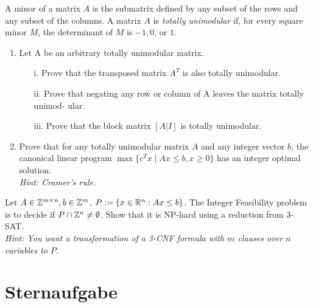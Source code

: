 \documentclass{uebung_cs}
\begin{document}
\begin{aufgabe}
	A minor of a matrix $A$ is the submatrix defined by any subset of the rows and any subset of the columns. A matrix $A$ is \emph{totally unimodular} if, for every square minor $M$, the determinant of $M$ is $−1, 0$, or $1$.
	\begin{enumerate}
		\item Let A be an arbitrary totally unimodular matrix.
		\begin{itemize}
			\item[i.] Prove that the transposed matrix $A^T$ is also totally unimodular.
			\item[ii.] Prove that negating any row or column of A leaves the matrix totally unimod- ular.
			\item[iii.] Prove that the block matrix $[A | I ]$ is totally unimodular.
		\end{itemize}
		\item Prove that for any totally unimodular matrix $A$ and any integer vector $b$, the canonical linear program $\max\{c^T x  \; | \; Ax \leq b, x \geq 0\}$ has an integer optimal solution. \\
		\emph{Hint: Cramer’s rule.}
	\end{enumerate}
\end{aufgabe}

\begin{aufgabe}
	Let $A \in \mathbb{Z}^{m\times n}, b \in \mathbb{Z}^m$, $P := \{x \in \mathbb{R}^n : Ax \leq b \}$.
	The Integer Feasibility problem is to decide if $P \cap \mathbb{Z}^n \neq \emptyset$.
	Show that it is NP-hard using a reduction from 3-SAT. \\
	\emph{Hint: You want a transformation of a 3-CNF formula with $m$ clauses over $n$ variables to $P$.}
\end{aufgabe}


\section*{Sternaufgabe}

\begin{aufgabe}
\end{aufgabe}
\end{document}
